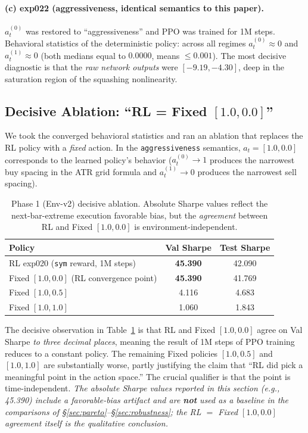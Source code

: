 \documentclass[11pt, a4paper]{article}
\begin{document}
\paragraph{(c) exp022 (aggressiveness, identical semantics to this paper).}
$a_t^{(0)}$ was restored to ``aggressiveness'' and PPO was trained for 1M
steps. Behavioral statistics of the deterministic policy: across all regimes
$a_t^{(0)} \approx 0$ and $a_t^{(1)} \approx 0$ (both medians equal to
$0.0000$, means $\leq 0.001$). The most decisive diagnostic is that the
\emph{raw network outputs} were $[-9.19, -4.30]$, deep in the saturation
region of the squashing nonlinearity.

\subsection{Decisive Ablation: ``RL = Fixed $[1.0, 0.0]$''}
\label{sec:phase1_ablation}

We took the converged behavioral statistics and ran an ablation that replaces
the RL policy with a \emph{fixed} action. In the \texttt{aggressiveness}
semantics, $a_t = [1.0, 0.0]$ corresponds to the learned policy's behavior
($a_t^{(0)} \to 1$ produces the narrowest buy spacing in the ATR grid formula
and $a_t^{(1)} \to 0$ produces the narrowest sell spacing).

\begin{table}[!htbp]
\centering
\caption{Phase 1 (Env-v2) decisive ablation. Absolute Sharpe values reflect
the next-bar-extreme execution favorable bias, but the
\emph{agreement} between RL and Fixed $[1.0, 0.0]$ is environment-independent.}
\begin{tabular}{lcc}
\toprule
Policy & Val Sharpe & Test Sharpe \\
\midrule
RL exp020 (\texttt{sym} reward, 1M steps) & \textbf{45.390} & 42.090 \\
Fixed $[1.0, 0.0]$ (RL convergence point) & \textbf{45.390} & 41.769 \\
\midrule
Fixed $[1.0, 0.5]$ & 4.116 & 4.683 \\
Fixed $[1.0, 1.0]$ & 1.060 & 1.843 \\
\bottomrule
\end{tabular}
\label{tab:phase1_ablation}
\end{table}

The decisive observation in Table~\ref{tab:phase1_ablation} is that RL and
Fixed $[1.0, 0.0]$ agree on Val Sharpe \emph{to three decimal places}, meaning
the result of 1M steps of PPO training reduces to a constant policy. The
remaining Fixed policies $[1.0, 0.5]$ and $[1.0, 1.0]$ are substantially
worse, partly justifying the claim that ``RL did pick a meaningful point in
the action space.'' The crucial qualifier is that the point is
time-independent.
\emph{The absolute Sharpe values reported in this section (e.g., 45.390)
include a favorable-bias artifact and are \textbf{not} used as a baseline
in the comparisons of \S\ref{sec:pareto}--\S\ref{sec:robustness}; the RL
$=$ Fixed $[1.0, 0.0]$ agreement itself is the qualitative conclusion.}
\end{document}
